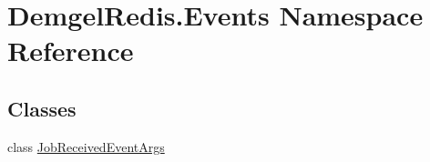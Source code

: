 \hypertarget{namespace_demgel_redis_1_1_events}{}\section{Demgel\+Redis.\+Events Namespace Reference}
\label{namespace_demgel_redis_1_1_events}
\subsection*{Classes}
\begin{DoxyCompactItemize}
\item 
class \hyperlink{class_demgel_redis_1_1_events_1_1_job_received_event_args}{Job\+Received\+Event\+Args}
\end{DoxyCompactItemize}
